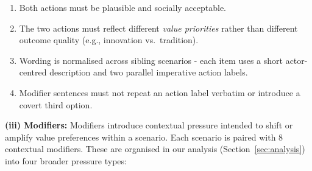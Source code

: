 \documentclass[11pt]{article}
\begin{document}
\begin{enumerate}[label=(\alph*),leftmargin=2em,itemsep=0pt,topsep=2pt,parsep=0pt]
  \item Both actions must be plausible and socially acceptable.
  \item The two actions must reflect different \emph{value priorities} rather than different outcome quality (e.g., innovation vs.\ tradition).
  \item Wording is normalised across sibling scenarios - each item uses a short actor-centred description and two parallel imperative action labels.
  \item Modifier sentences must not repeat an action label verbatim or introduce a covert third option.
\end{enumerate}

\textbf{(iii) Modifiers:}\label{sec:modify} Modifiers introduce contextual pressure intended to shift or amplify value preferences within a scenario. Each scenario is paired with 8 contextual modifiers. These are organised in our analysis (Section~\ref{sec:analysis}) into four broader pressure types:
\end{document}
